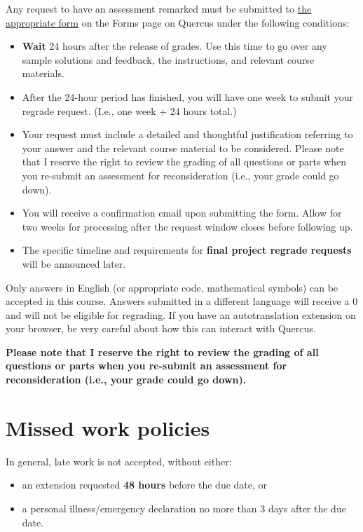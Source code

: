 \documentclass[
  openany]{book}
\begin{document}
Any request to have an assessment remarked must be submitted to \href{https://forms.office.com/Pages/ResponsePage.aspx?id=JsKqeAMvTUuQN7RtVsVSEOKHUU3SzAJJhmOKjJhDWEpUNE02UzJaMUNQM0Q2U0RTOUlJS1JMM1dCTC4u}{the appropriate form} on the Forms page on Quercus under the following conditions:

\begin{itemize}
\item
  \textbf{Wait} 24 hours after the release of grades. Use this time to go over any sample solutions and feedback, the instructions, and relevant course materials.
\item
  After the 24-hour period has finished, you will have one week to submit your regrade request. (I.e., one week + 24 hours total.)
\item
  Your request must include a detailed and thoughtful justification referring to your answer and the relevant course material to be considered. Please note that I reserve the right to review the grading of all questions or parts when you re-submit an assessment for reconsideration (i.e., your grade could go down).
\item
  You will receive a confirmation email upon submitting the form. Allow for two weeks for processing after the request window closes before following up.
\item
  The specific timeline and requirements for \textbf{final project regrade requests} will be announced later.
\end{itemize}

Only answers in English (or appropriate code, mathematical symbols) can be accepted in this course. Answers submitted in a different language will receive a 0 and will not be eligible for regrading. If you have an autotranslation extension on your browser, be very careful about how this can interact with Quercus.

\textbf{Please note that I reserve the right to review the grading of all questions or parts when you re-submit an assessment for reconsideration (i.e., your grade could go down).}

\hypertarget{missed-work-policies}{%
\section{Missed work policies}\label{missed-work-policies}}

In general, late work is not accepted, without either:

\begin{itemize}
\item
  an extension requested \textbf{48 hours} before the due date, or
\item
  a personal illness/emergency declaration no more than 3 days after the due date.
\end{itemize}
\end{document}
